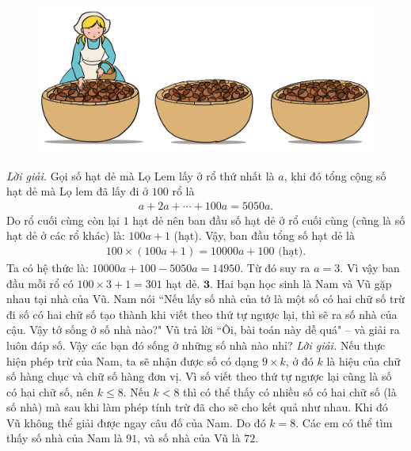 \begin{multicols}{2}
	\begin{figure}[H]
		\centering
		\vspace*{-10pt}
		\captionsetup{labelformat= empty, justification=centering}
		\includegraphics[width=1\linewidth]{Pi10_ToanBi_Bai2}
		\vspace*{-15pt}
	\end{figure}
	\textit{Lời giải.} 	Gọi số hạt dẻ mà Lọ Lem lấy ở rổ thứ nhất là $a$, khi đó tổng cộng số hạt dẻ mà Lọ lem đã lấy đi ở $100$ rổ là
	\begin{align*}
		a+ 2a+\cdots+100a=5050a.
	\end{align*} 
	Do rổ cuối cùng còn lại $1$ hạt dẻ nên ban đầu số hạt dẻ ở rổ cuối cùng (cũng là số hạt dẻ ở các rổ khác) là: $100a+1$ (hạt).
	\vskip 0.1cm
	Vậy, ban đầu tổng số hạt dẻ là
	\begin{align*}
		100\times(100a+1) = 10000a+100 \text{  (hạt).}
	\end{align*} 
	Ta có hệ thức là: $10000a+100-5050 a =14950$. Từ đó suy ra $a=3$. Vì vậy ban đầu mỗi rổ có  $100\times 3+1 = 301$ hạt dẻ.
	\vskip 0.1cm
	$\pmb{3.}$ Hai bạn học sinh là Nam và Vũ gặp nhau tại nhà của Vũ. Nam nói ``Nếu lấy số nhà của tớ là một số có hai chữ số trừ đi số có hai chữ số tạo thành khi viết theo thứ tự ngược lại, thì sẽ ra số nhà của cậu. Vậy tớ sống ở số nhà nào?"
	\vskip 0.1cm
	Vũ trả lời ``Ôi, bài toán này dễ quá" -- và giải ra luôn đáp số.
	\vskip 0.1cm
	Vậy các bạn đó sống ở những số nhà nào nhỉ?
	\vskip 0.1cm
	\textit{Lời giải.} 	Nếu thực hiện phép trừ của Nam, ta sẽ nhận được số có dạng $9\times k$, ở đó $k$ là hiệu của chữ số hàng chục và chữ số hàng đơn vị. Vì số viết theo thứ tự ngược lại cũng là số có hai chữ số, nên $k\le8$. 
	\vskip 0.1cm
	Nếu $k<8$ thì có thể thấy có nhiều số có hai chữ số (là số nhà) mà sau khi làm phép tính trừ đã cho sẽ cho kết quả như nhau. Khi đó Vũ không thể giải được ngay câu đố của Nam. Do đó $k=8$. Các em có thể tìm thấy số nhà của Nam là $91$, và số nhà của Vũ là $72$.
	\begin{figure}[H]

\end{figure}
\end{multicols}
